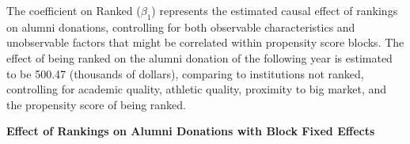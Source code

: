 \documentclass[12pt]{article}
\begin{document}
The coefficient on Ranked ($\beta_1$) represents the estimated causal effect of rankings on alumni donations, controlling for both observable characteristics and unobservable factors that might be correlated within propensity score blocks. The effect of being ranked on the alumni donation of the following year is estimated to be 500.47 (thousands of dollars), comparing to institutions not ranked, controlling for academic quality, athletic quality, proximity to big market, and the propensity score of being ranked.


\begin{table}[H]
    \centering
    \caption{\textbf{Effect of Rankings on Alumni Donations with Block Fixed Effects}}
    \label{tab:block_effects}
    
\end{table}
\end{document}
